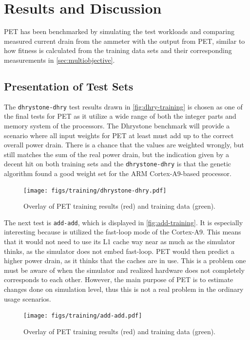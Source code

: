 \section{Results and Discussion}

PET has been benchmarked by simulating the test workloads and comparing measured
current drain from the ammeter with the output from PET, similar to how fitness
is calculated from the training data sets and their corresponding measurements
in \autoref{sec:multiobjective}.


\subsection{Presentation of Test Sets}

The \texttt{dhrystone-dhry} test results drawn in \autoref{fig:dhry-training}
is chosen as one of the final tests for PET as it utilize a wide range of both the
integer parts and memory system of the processors. The Dhrystone benchmark will
provide a scenario where all input weights for PET at least must add up to the correct
overall power drain. There is a chance that the values are weighted wrongly, but
still matches the sum of the real power drain, but the indication given by a decent hit
on both training sets and the \texttt{dhrystone-dhry} is that the genetic algorithm
found a good weight set for the ARM Cortex-A9-based processor.

\begin{figure}[ht]
\centering
\texttt{[image: figs/training/dhrystone-dhry.pdf]}
\caption{Overlay of PET training results (red) and training data (green).}
\label{fig:dhry-training}
\end{figure}

The next test is \texttt{add-add}, which is displayed in \autoref{fig:add-training}.
It is especially interesting because is utilized the fast-loop mode of the
Cortex-A9. This means that it would not need to use its L1 cache way near as
much as the simulator thinks, as the simulator does not embed fast-loop. PET
would then predict a higher power drain, as it thinks that the caches are in
use. This is a problem one must be aware of when the simulator and realized
hardware does not completely corresponds to each other. However, the main
purpose of PET is to estimate changes done on simulation level, thus this is not
a real problem in the ordinary usage scenarios.

\begin{figure}[ht]
\centering
\texttt{[image: figs/training/add-add.pdf]}
\caption{Overlay of PET training results (red) and training data (green).}
\label{fig:add-training}
\end{figure}


